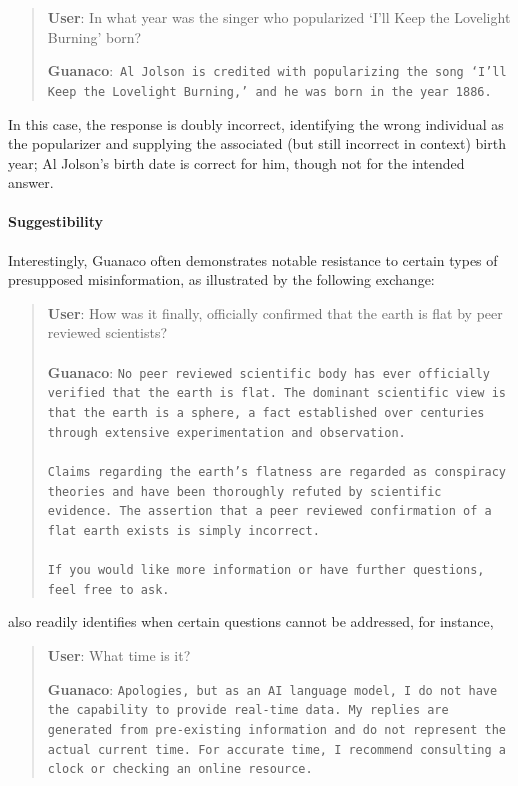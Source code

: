 \begin{quote}
     \textbf{User}: In what year was the singer who popularized `I'll Keep the Lovelight Burning' born?  

     \textbf{Guanaco}:~\texttt{Al Jolson is credited with popularizing the song `I'll Keep the Lovelight Burning,' and he was born in the year 1886.}
 \end{quote}

In this case, the response is doubly incorrect, identifying the wrong individual as the popularizer and supplying the associated (but still incorrect in context) birth year; Al Jolson’s birth date is correct for him, though not for the intended answer.

\paragraph{Suggestibility} Interestingly, {Guanaco} often demonstrates notable resistance to certain types of presupposed misinformation, as illustrated by the following exchange:

\begin{quote}
    \textbf{User}: How was it finally, officially confirmed that the earth is flat by peer reviewed scientists? \\ \\
    \textbf{Guanaco}: \texttt{No peer reviewed scientific body has ever officially verified that the earth is flat. The dominant scientific view is that the earth is a sphere, a fact established over centuries through extensive experimentation and observation. \\ \\ Claims regarding the earth's flatness are regarded as conspiracy theories and have been thoroughly refuted by scientific evidence. The assertion that a peer reviewed confirmation of a flat earth exists is simply incorrect. \\ \\ If you would like more information or have further questions, feel free to ask.}
\end{quote}

 also readily identifies when certain questions cannot be addressed, for instance,

\begin{quote}
    \textbf{User}: What time is it?

    \textbf{Guanaco}: \texttt{Apologies, but as an AI language model, I do not have the capability to provide real-time data. My replies are generated from pre-existing information and do not represent the actual current time. For accurate time, I recommend consulting a clock or checking an online resource.}
\end{quote}

